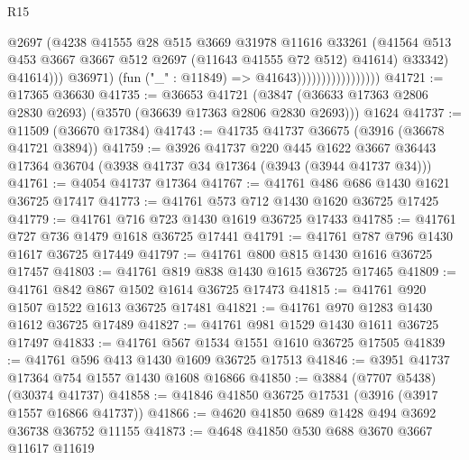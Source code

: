 \begin{lexlean}{R15}
\begin{coremodule}
                                            @2697
                                            (@4238
                                              @41555
                                              @28
                                              @515
                                              @3669
                                              @31978
                                              @11616
                                              @33261
                                              (@41564
                                                @513
                                                @453
                                                @3667
                                                @3667
                                                @512
                                                @2697
                                                (@11643 @41555 @72 @512)
                                                @41614)
                                              @33342)
                                            @41614)))
                                      @36971)
                                    (fun ("_" : @11849) => @41643)))))))))))))))))
@41721 := @17365 @36630
@41735 := @36653
    @41721
    (@3847 (@36633 @17363 @2806 @2830 @2693) (@3570 (@36639 @17363 @2806 @2830 @2693)))
    @1624
@41737 := @11509 (@36670 @17384)
@41743 := @41735 @41737 @36675 (@3916 (@36678 @41721 @3894))
@41759 := @3926
    @41737
    @220
    @445
    @1622
    @3667
    @36443
    @17364
    @36704
    (@3938 @41737 @34 @17364 (@3943 (@3944 @41737 @34)))
@41761 := @4054 @41737 @17364
@41767 := @41761 @486 @686 @1430 @1621 @36725 @17417
@41773 := @41761 @573 @712 @1430 @1620 @36725 @17425
@41779 := @41761 @716 @723 @1430 @1619 @36725 @17433
@41785 := @41761 @727 @736 @1479 @1618 @36725 @17441
@41791 := @41761 @787 @796 @1430 @1617 @36725 @17449
@41797 := @41761 @800 @815 @1430 @1616 @36725 @17457
@41803 := @41761 @819 @838 @1430 @1615 @36725 @17465
@41809 := @41761 @842 @867 @1502 @1614 @36725 @17473
@41815 := @41761 @920 @1507 @1522 @1613 @36725 @17481
@41821 := @41761 @970 @1283 @1430 @1612 @36725 @17489
@41827 := @41761 @981 @1529 @1430 @1611 @36725 @17497
@41833 := @41761 @567 @1534 @1551 @1610 @36725 @17505
@41839 := @41761 @596 @413 @1430 @1609 @36725 @17513
@41846 := @3951 @41737 @17364 @754 @1557 @1430 @1608 @16866
@41850 := @3884 (@7707 @5438) (@30374 @41737)
@41858 := @41846 @41850 @36725 @17531 (@3916 (@3917 @1557 @16866 @41737))
@41866 := @4620 @41850 @689 @1428 @494 @3692 @36738 @36752 @11155
@41873 := @4648 @41850 @530 @688 @3670 @3667 @11617 @11619

\end{coremodule}
\end{lexlean}
